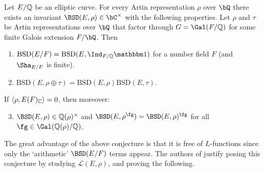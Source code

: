 \begin{conj}{\cite[Conjecture 4]{DEW1}}\label{conj_4}
    Let $E/\mathbb{Q}$ be an elliptic curve. 
    For every Artin representation $\rho$ over $\bQ$ there exists an invariant $\BSD(E, \rho) \in \bC^{\times}$ with the following properties. 
    Let $\rho$ and $\tau$ be Artin representations over $\bQ$ that factor through $G = \Gal(F/\QQ)$ for some finite Galois extension $F / \bQ$. Then 
    \begin{enumerate}[label={\bfseries C\arabic*.}]
        \setlength\itemsep{0em}
        \item $\mathrm{BSD}(E/F)=\mathrm{BSD}(E,\Ind_{F/\QQ}\trivial)$ for a number field $F$ (and $\Sha_{E/F}$ is finite).
        \item $\mathrm{BSD}(E,\rho\oplus\tau)=\mathrm{BSD}(E,\rho)\mathrm{BSD}(E,\tau)$.
    \end{enumerate}       
        If $\langle\rho,E(F)_{\mathbb{C}}\rangle=0$, then moreover:
    \begin{enumerate}[label={\bfseries C\arabic*.}]
        \setcounter{enumi}{2}
       \item $\BSD(E,\rho)\in\QQ(\rho)^{\times}$ and $\BSD(E,\rho^{\fg})=\BSD(E,\rho)^{\fg}$ for all $\fg\in\Gal(\QQ(\rho)/\QQ)$. 
    \end{enumerate}
\end{conj}

The great advantage of the above conjecture is that it is free of $L$-functions since only the `arithmetic' $\BSD(E/F)$ terms appear. The authors of \cite{DEW1} justify posing this conjecture by studying $\mathcal{L}(E, \rho)$, and proving the following.

